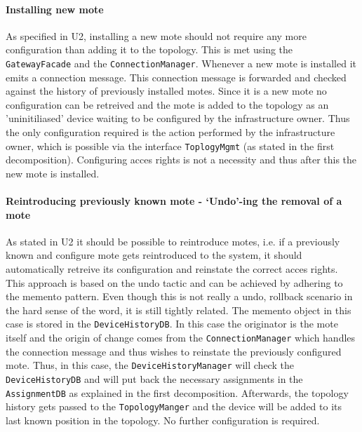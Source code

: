 \documentclass[english]{sareport}
\begin{document}
\paragraph{Installing new mote} 
As specified in U2, installing a new mote should not require any more configuration than adding it to the topology. This is met using the \texttt{GatewayFacade} and the \texttt{ConnectionManager}. Whenever a new mote is installed it emits a connection message. This connection message is forwarded and checked against the history of previously installed motes. Since it is a new mote no configuration can be retreived and the mote is added to the topology as an 'uninitiliased' device waiting to be configured by the infrastructure owner. Thus the only configuration required is the action performed by the infrastructure owner, which is possible via the interface \texttt{ToplogyMgmt} (as stated in the first decomposition). Configuring acces rights is not a necessity and thus after this the new mote is installed.

\paragraph{Reintroducing previously known mote - `Undo'-ing the removal of a mote}
As stated in U2 it should be possible to reintroduce motes, i.e. if a previously known and configure mote gets reintroduced to the system, it should automatically retreive its configuration and reinstate the correct acces rights. This approach is based on the undo tactic and can be achieved by adhering to the memento pattern. Even though this is not really a undo, rollback scenario in the hard sense of the word, it is still tightly related. The memento object in this case is stored in the \texttt{DeviceHistoryDB}. In this case the originator is the mote itself and the origin of change comes from the \texttt{ConnectionManager} which handles the connection message and thus wishes to reinstate the previously configured mote. Thus, in this case, the \texttt{DeviceHistoryManager} will check the \texttt{DeviceHistoryDB} and will put back the necessary assignments in the \texttt{AssignmentDB} as explained in the first decomposition. Afterwards, the topology history gets passed to the \texttt{TopologyManger} and the device will be added to its last known position in the topology. No further configuration is required.
\end{document}
